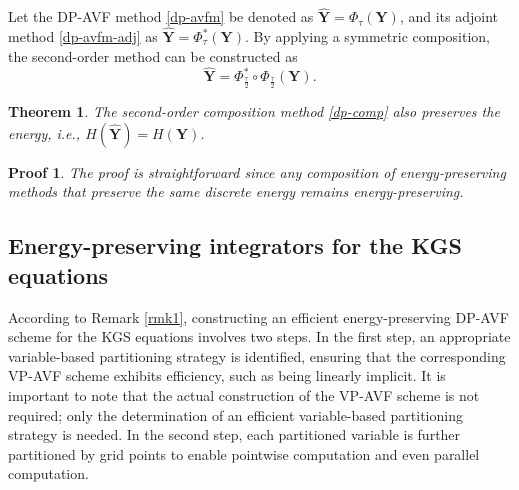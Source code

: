 \documentclass[fleqn,11pt]{elsarticle}
\numberwithin{equation}{section}
\newtheorem{thm}{Theorem}[section]
\newtheorem*{prf}{Proof}
\begin{document}
%
Let the DP-AVF method \eqref{dp-avfm} be denoted as $\widehat{\bm{Y}} = \Phi_\tau(\bm{Y})$, and its adjoint method \eqref{dp-avfm-adj} as $\widehat{\bm{Y}} = \Phi^*_\tau(\bm{Y})$. By applying a symmetric composition, the second-order method can be constructed as
\begin{equation}\label{dp-comp}
	\widehat{\bm Y}=\Phi^*_\frac{\tau}{2}\circ\Phi_\frac{\tau}{2}({\bm Y}).
\end{equation}


\begin{thm}
	The second-order composition method \eqref{dp-comp} also preserves the energy, i.e., $H(\widehat{\bm Y})=H(\bm Y)$.
\end{thm}

\begin{prf}
	The proof is straightforward since any composition of energy-preserving methods that preserve the same discrete energy remains energy-preserving.
\end{prf}





\subsection{Energy-preserving integrators for the KGS equations}

According to Remark \ref{rmk1}, constructing an efficient energy-preserving DP-AVF scheme for the KGS equations involves two steps. In the first step, an appropriate variable-based partitioning strategy is identified, ensuring that the corresponding VP-AVF scheme exhibits efficiency, such as being linearly implicit. It is important to note that the actual construction of the VP-AVF scheme is not required; only the determination of an efficient variable-based partitioning strategy is needed. In the second step, each partitioned variable is further partitioned by grid points to enable pointwise computation and even parallel computation.
\end{document}
